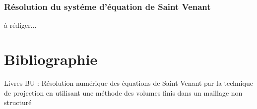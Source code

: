\documentclass[12pt]{article}
\begin{document}
\subsubsection{Résolution du systéme d'équation de Saint Venant}
à rédiger...
\newpage
\section{Bibliographie}
Livres BU : Résolution numérique des équations de Saint-Venant par la technique de projection en utilisant une méthode des volumes finis dans un maillage non structuré 



\end{document}

